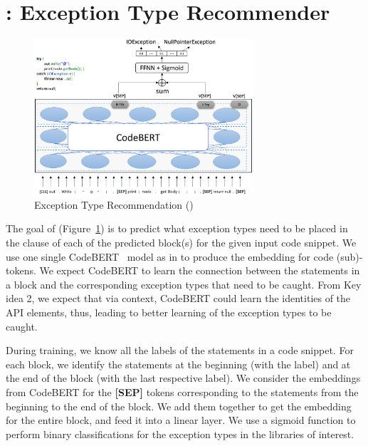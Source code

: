 \section{{\xtype}: Exception Type Recommender}
\label{sec:xtype}

\begin{figure}[t]
\begin{center}
\includegraphics[width=3.2in]{xtype-4.png}
\vspace{-8pt}
\caption{Exception Type Recommendation ({\xtype})}
\label{fig:xtype}
\end{center}
\end{figure}

The goal of {\xtype} (Figure~\ref{fig:xtype}) is to predict what
exception types need to be placed in the  clause of each
of the predicted  block(s) for the given input code
snippet. We use one single CodeBERT~\cite{codebert-emnlp20} model as
in {\xblock} to produce the embedding for code (sub)-tokens.
%
We expect CodeBERT to learn the connection between the statements in a
 block and the corresponding exception types that need
to be caught. From Key idea 2, we expect that via context, CodeBERT
could learn the identities of the API elements, thus, leading to
better learning of the exception types to be caught.

During training, we know all the labels of the statements in a code
snippet. For each  block, we identify the statements
at the beginning (with the  label) and at the end of the
block (with the last respective  label).
We consider the embeddings from CodeBERT for the {\bf [SEP]}
tokens corresponding to the statements from the beginning to the end
of the block. We add them together to get the
embedding for the entire  block, and feed it into
a linear layer. We use a sigmoid function to perform binary
classifications for the exception types in the libraries of interest.

